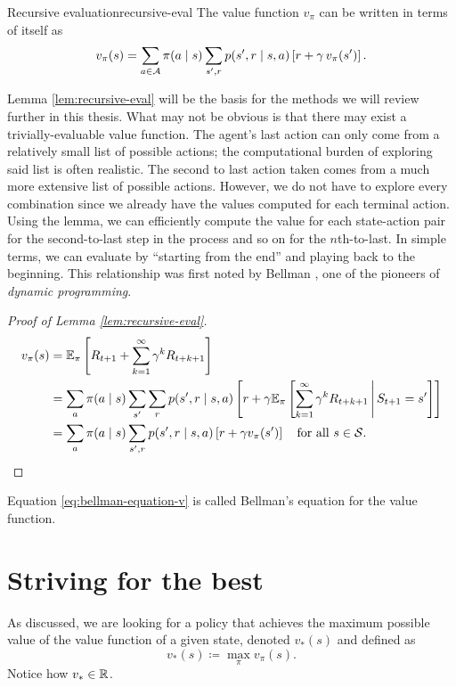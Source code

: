 \begin{lemma}{Recursive evaluation}{recursive-eval}
	The value function $v_\pi$ can be written in terms of itself as
	\begin{equation*}
		v_\pi (s) = \sum_{a \in \mathcal{A}} \pi(a \mid s) \sum_{s', r} p(s', r \mid s, a) \left[ r + \gamma \, v_\pi (s') \right].
	\end{equation*}
\end{lemma}

Lemma \ref{lem:recursive-eval} will be the basis for the methods we will review
further in this thesis. What may not be obvious is that there may exist a
trivially-evaluable value function. The agent's last action can only come from a
relatively small list of possible actions; the computational burden of exploring
said list is often realistic. The second to last action taken comes from a much
more extensive list of possible actions. However, we do not have to explore
every combination since we already have the values computed for each terminal
action.  Using the lemma, we can efficiently compute the value for each
state-action pair for the second-to-last step in the process and so on for the
$n$th-to-last. In simple terms, we can evaluate by ``starting from the end'' and
playing back to the beginning. This relationship was first noted by Bellman
\cite{bellman1957}, one of the pioneers of \textit{dynamic programming}.

\begin{proof}[Proof of Lemma \ref{lem:recursive-eval}]
	\begin{align}
		\label{eq:bellman-equation-v}
		v_\pi (s) &= \mathbb{E}_{\pi} \left[ R_{t+1} + \sum_{k=1}^{\infty} \gamma^{k} R_{t+k+1} \right] \nonumber \\
		&= \sum_a \pi(a \mid s) \sum_{s'} \sum_r p(s', r \mid s, a) \left[ r + \gamma \mathbb{E}_\pi \left[ \sum_{k=1}^{\infty} \gamma^{k} R_{{t+k+1}} \,\middle\vert\, S_{t+1} = s' \right] \right] \nonumber \\
		&= \sum_a \pi(a \mid s) \sum_{s', r} p(s', r \mid s, a) \left[ r + \gamma v_{\pi} (s') \right] \quad \text{for all } s \in \mathcal{S}.
	\end{align}
\end{proof}

Equation \eqref{eq:bellman-equation-v} is called Bellman's equation for the
value function.

\section{Striving for the best}
As discussed, we are looking for a policy that achieves the maximum possible value
of the value function of a given state, denoted $v_*(s)$ and defined as
\begin{equation*}
	v_* (s) \coloneqq \max_{\pi} v_\pi (s).
\end{equation*}
Notice how $v_* \in \mathbb{R}$.

